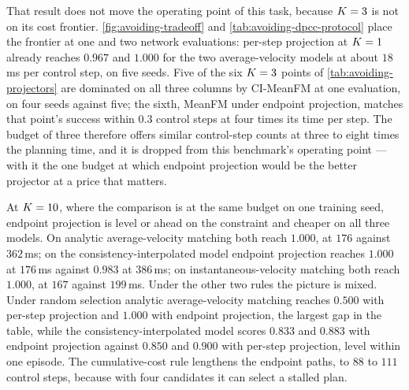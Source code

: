 That result does not move the operating point of this task, because $K=3$ is not on its cost frontier.
\autoref{fig:avoiding-tradeoff} and \autoref{tab:avoiding-dpcc-protocol} place the frontier at one and
two network evaluations: per-step projection at $K=1$ already reaches $0.967$ and $1.000$ for the two
average-velocity models at about $18$\,ms per control step, on five seeds. Five of the six $K=3$ points of
\autoref{tab:avoiding-projectors} are dominated on all three columns by CI-MeanFM at one evaluation, on four
seeds against five; the sixth, MeanFM under endpoint projection, matches that point's success within $0.3$
control steps at four times its time per step. The budget of three therefore offers similar control-step
counts at three to eight times the planning time, and it is dropped from this benchmark's operating point
--- with it the one budget at which endpoint projection would be the better projector at a price that
matters.

At $K=10$, where the comparison is at the same budget on one training seed, endpoint projection is level
or ahead on the constraint and cheaper on all three models. On analytic average-velocity matching both reach
$1.000$, at $176$ against $362$\,ms; on the consistency-interpolated model endpoint projection reaches
$1.000$ at $176$\,ms against $0.983$ at $386$\,ms; on instantaneous-velocity matching both reach $1.000$, at
$167$ against $199$\,ms. Under the other two rules the picture is mixed. Under random selection analytic
average-velocity matching reaches $0.500$ with per-step projection and $1.000$ with endpoint projection, the
largest gap in the table, while the consistency-interpolated model scores $0.833$ and $0.883$ with endpoint
projection against $0.850$ and $0.900$ with per-step projection, level within one episode. The
cumulative-cost rule lengthens the endpoint paths, to $88$ to $111$ control steps, because with four
candidates it can select a stalled plan. 

